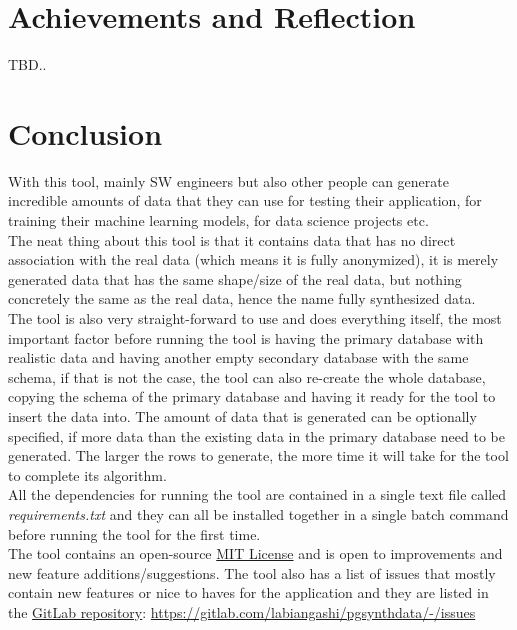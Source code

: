 \section{Achievements and Reflection}
TBD..
\section{Conclusion}
With this tool, mainly SW engineers but also other people can generate incredible amounts of data that they can use for testing their application, for training their machine learning models, for data science projects etc.\\
\newline
The neat thing about this tool is that it contains data that has no direct association with the real data (which means it is fully anonymized), it is merely generated data that has the same shape/size of the real data, but nothing concretely the same as the real data, hence the name fully synthesized data.\\
\newline
The tool is also very straight-forward to use and does everything itself, the most important factor before running the tool is having the primary database with realistic data and having another empty secondary database with the same schema, if that is not the case, the tool can also re-create the whole database, copying the schema of the primary database and having it ready for the tool to insert the data into. The amount of data that is generated can be optionally specified, if more data than the existing data in the primary database need to be generated. The larger the rows to generate, the more time it will take for the tool to complete its algorithm.\\
All the dependencies for running the tool are contained in a single text file called \textit{requirements.txt} and they can all be installed together in a single batch command before running the tool for the first time.\\
\newline
The tool contains an open-source \href{https://opensource.org/licenses/MIT}{MIT License} and is open to improvements and new feature additions/suggestions. The tool also has a list of issues that mostly contain new features or nice to haves for the application and they are listed in the \href{https://gitlab.com/labiangashi/pgsynthdata/-/issues}{GitLab repository}: \href{https://gitlab.com/labiangashi/pgsynthdata/-/issues}{https://gitlab.com/labiangashi/pgsynthdata/-/issues}

